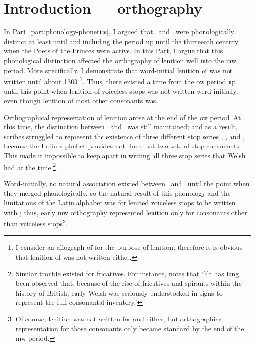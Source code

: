 \chapter{Introduction --- orthography}
\label{cha:intr-orth}

In Part~\ref{part:phonology-phonetics}, I argued that \lT\ and \xD\ were phonologically distinct at least until and including the period up until the thirteenth century when the Poets of the Princes were active. In this Part, I argue that this phonological distinction affected the orthography of lenition well into the \gls{mw} period. More specifically, I demonstrate that word-initial lenition of  was not written until about 1300%
\footnote{I consider  an allograph of  for the purpose of lenition; therefore it is obvious that lenition of  was not written either.}.
Thus, there existed a time from the \gls{ow} period up until this point when lenition of  voiceless stops was not written word-initially, even though lenition of most other consonants was.

Orthographical representation of lenition arose at the end of the \gls{ow} period. At this time, the distinction between \lT\ and \xD\ was still maintained; and as a result, scribes struggled to represent the existence of three different stop series \xT, \lT, and \xD, because the Latin alphabet  provides not three but two sets of stop consonants. This made it impossible to keep apart in writing all three stop series that Welsh had at the time%
\footnote{Similar trouble existed for fricatives. For instance, \textcite[28]{russell_rowynniauc_2003} notes that `[i]t has long been observed that, because of the rise of fricatives and spirants within the history of British, early Welsh was seriously understocked in signs to represent the full consonantal inventory.'}.

Word-initially, no natural association existed between \lT\ and \xD\ until the point when they merged phonologically, so the natural result of this phonology and the limitations of the Latin alphabet was for lenited voiceless stops to be written with ; thus, early \gls{mw} orthography represented lenition only for consonants other than voiceless stops\footnote{Of course, lenition was not written for  and  either, but orthographical representation for those consonants only became standard by the end of the \gls{mw} period.}.

